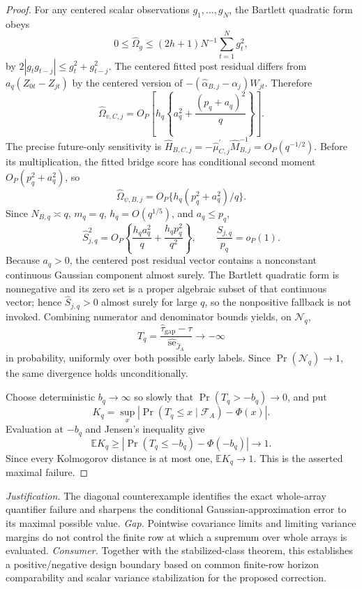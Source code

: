 \documentclass{article}
\begin{document}
\begin{proof}
For any centered scalar observations \(g_1,\ldots,g_N\), the Bartlett quadratic form obeys
\[
 0\leq\widehat\Omega_g\leq(2h+1)N^{-1}\sum_{t=1}^Ng_t^2,
\]
by \(2|g_tg_{t-j}|\leq g_t^2+g_{t-j}^2\).  The centered fitted post residual differs from \(a_q(Z_{0t}-Z_{jt})\) by the centered version of \(-(\widehat\alpha_{B,j}-\alpha_j)W_{jt}\).  Therefore
\[
 \widehat\Omega_{v,C,j}
 =O_P\left[h_q\left\{a_q^2+\frac{(p_q+a_q)^2}{q}\right\}\right].
\]
The precise future-only sensitivity is \(\widehat H_{B,C,j}=-\widehat\mu_{C,j}^{\prime}\widehat M_{B,j}^{-1}=O_P(q^{-1/2})\).  Before its multiplication, the fitted bridge score has conditional second moment \(O_P(p_q^2+a_q^2)\), so
\[
 \widehat\Omega_{\psi,B,j}=O_P\{h_q(p_q^2+a_q^2)/q\}.
\]
Since \(N_{B,q}\asymp q\), \(m_q=q\), \(h_q=O(q^{1/5})\), and \(a_q\leq p_q\),
\[
 \widehat S_{j,q}^2
 =O_P\left\{\frac{h_qa_q^2}{q}+\frac{h_qp_q^2}{q^2}\right\},
 \qquad
 \frac{\widehat S_{j,q}}{p_q}=o_P(1).
\]
Because \(a_q>0\), the centered post residual vector contains a nonconstant continuous Gaussian component almost surely.  The Bartlett quadratic form is nonnegative and its zero set is a proper algebraic subset of that continuous vector; hence \(\widehat S_{j,q}>0\) almost surely for large \(q\), so the nonpositive fallback is not invoked.  Combining numerator and denominator bounds yields, on \(\mathcal N_q\),
\[
 T_q=\frac{\widehat\tau_{\mathrm{gap}}-\tau}
 {\widehat{\operatorname{se}}_{\widehat J_A}}\to-\infty
\]
in probability, uniformly over both possible early labels.  Since \(\Pr(\mathcal N_q)\to1\), the same divergence holds unconditionally.

Choose deterministic \(b_q\to\infty\) so slowly that \(\Pr(T_q>-b_q)\to0\), and put
\[
 K_q=\sup_x\left|\Pr(T_q\leq x\mid\mathcal F_A)-\Phi(x)\right|.
\]
Evaluation at \(-b_q\) and Jensen's inequality give
\[
 \mathbb EK_q\geq
 \left|\Pr(T_q\leq-b_q)-\Phi(-b_q)\right|\to1.
\]
Since every Kolmogorov distance is at most one, \(\mathbb EK_q\to1\).  This is the asserted maximal failure.
\end{proof}
\par\smallskip\noindent \textit{Justification.} The diagonal counterexample identifies the exact whole-array quantifier failure and sharpens the conditional Gaussian-approximation error to its maximal possible value. \textit{Gap.} Pointwise covariance limits and limiting variance margins do not control the finite row at which a supremum over whole arrays is evaluated. \textit{Consumer.} Together with the stabilized-class theorem, this establishes a positive/negative design boundary based on common finite-row horizon comparability and scalar variance stabilization for the proposed correction.
\end{document}
